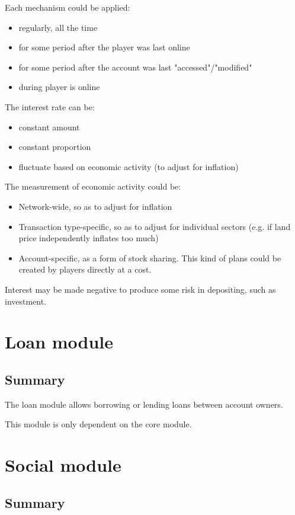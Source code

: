 \documentclass{report}
\begin{document}
				Each mechanism could be applied:
				\begin{itemize}
					\item regularly, all the time
					\item for some period after the player was last online
					\item for some period after the account was last "accessed"/"modified"
					\item during player is online
				\end{itemize}

				The interest rate can be:
				\begin{itemize}
					\item constant amount
					\item constant proportion
					\item fluctuate based on economic activity (to adjust for inflation)
				\end{itemize}

				The measurement of economic activity could be:
				\begin{itemize}
					\item Network-wide, so as to adjust for inflation
					\item Transaction type-specific, so as to adjust for individual sectors
						(e.g. if land price independently inflates too much)
					\item Account-specific, as a form of stock sharing.
						This kind of plans could be created by players directly at a cost.
				\end{itemize}

				Interest may be made negative to produce some risk in depositing, such as investment.

	\chapter{Loan module}
		\section{Summary}

			The loan module allows borrowing or lending loans between account owners.

			This module is only dependent on the core module.

	\chapter{Social module}
		\section{Summary}
\end{document}
